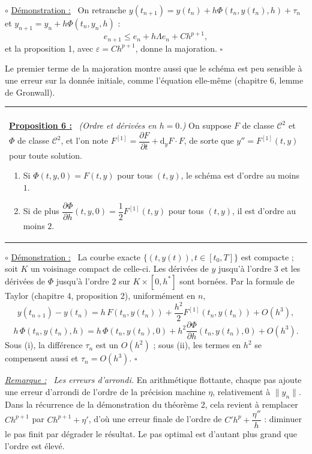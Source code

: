 \documentclass[a4paper,twoside]{report}
\makeatletter
\newenvironment{cadre}%
 {\par\vspace{2mm}\noindent\begin{tabular}{|@{\hspace{4mm}}p{0.93\textwidth}@{\hspace{4mm}}|}
  \hline \\[-2mm]}%
 {\\[2mm] \hline \end{tabular}\par\vspace{3mm}}
\newcommand{\propo}[1]{\textbf{\underline{Proposition #1 :}}~}
\newenvironment{demo}%
 {\par\needspace{4\baselineskip}\vspace{1mm}\noindent$\circ$ \underline{Démonstration :}~\setlength{\parskip}{3pt plus 1pt}}%
 {\hfill$\square$\par\vspace{2mm}}
\newenvironment{remarque}%
 {\par\needspace{6\baselineskip}\vspace{1mm}\begin{list}{}{\leftmargin=1cm \rightmargin=0.5cm}\item[]%
  \textit{\underline{Remarque :}}~}%
 {\end{list}\vspace{1mm}}
\newcommand{\dd}{\mathrm{d}}                      %
\newcommand{\norme}[1]{\lVert #1 \rVert}         %
\newcommand{\Cc}{\mathcal{C}}                     %
\newcommand{\dpd}[2]{\dfrac{\partial #1}{\partial #2}}  %
\makeatother
\begin{document}
\begin{demo}
On retranche $y(t_{n + 1}) = y(t_{n}) + h\Phi(t_{n}, y(t_{n}), h) + \tau_{n}$ et $y_{n + 1} = y_{n} + h\Phi(t_{n}, y_{n}, h)$ :
\[ e_{n + 1} \leqslant e_{n} + h\Lambda e_{n} + C h^{p + 1}, \]
et la proposition 1, avec $\varepsilon = C h^{p + 1}$, donne la majoration.
\end{demo}

\noindent Le premier terme de la majoration montre aussi que le schéma est peu sensible à une erreur sur la donnée initiale, comme l'équation elle-même (chapitre 6, lemme de Gronwall).

\begin{cadre}
\propo{6} \emph{(Ordre et dérivées en $h = 0$.)} On suppose $F$ de classe $\Cc^{2}$ et $\Phi$ de classe $\Cc^{2}$, et l'on note $F^{[1]} = \dpd{F}{t} + \dd_{y}F \cdot F$, de sorte que $y'' = F^{[1]}(t, y)$ pour toute solution.
\begin{enumerate}[label=(\roman*),topsep=3pt,itemsep=3pt]
  \item Si $\Phi(t, y, 0) = F(t, y)$ pour tous $(t, y)$, le schéma est d'ordre au moins $1$.
  \item Si de plus $\dpd{\Phi}{h}(t, y, 0) = \dfrac{1}{2}F^{[1]}(t, y)$ pour tous $(t, y)$, il est d'ordre au moins $2$.
\end{enumerate}
\end{cadre}

\begin{demo}
La courbe exacte $\{(t, y(t)), t \in [t_{0}, T]\}$ est compacte ; soit $K$ un voisinage compact de celle-ci. Les dérivées de $y$ jusqu'à l'ordre $3$ et les dérivées de $\Phi$ jusqu'à l'ordre $2$ sur $K \times [0, h^{*}]$ sont bornées. Par la formule de Taylor (chapitre 4, proposition 2), uniformément en $n$,
\[ y(t_{n + 1}) - y(t_{n}) = h\,F(t_{n}, y(t_{n})) + \frac{h^{2}}{2}F^{[1]}(t_{n}, y(t_{n})) + O(h^{3}), \]
\[ h\,\Phi(t_{n}, y(t_{n}), h) = h\,\Phi(t_{n}, y(t_{n}), 0) + h^{2}\dpd{\Phi}{h}(t_{n}, y(t_{n}), 0) + O(h^{3}). \]
Sous (i), la différence $\tau_{n}$ est un $O(h^{2})$ ; sous (ii), les termes en $h^{2}$ se compensent aussi et $\tau_{n} = O(h^{3})$.
\end{demo}

\begin{remarque}
\emph{Les erreurs d'arrondi.} En arithmétique flottante, chaque pas ajoute une erreur d'arrondi de l'ordre de la précision machine $\eta$, relativement à $\norme{y_{n}}$. Dans la récurrence de la démonstration du théorème 2, cela revient à remplacer $C h^{p + 1}$ par $C h^{p + 1} + \eta'$, d'où une erreur finale de l'ordre de $C' h^{p} + \dfrac{\eta''}{h}$ : diminuer le pas finit par dégrader le résultat. Le pas optimal est d'autant plus grand que l'ordre est élevé.
\end{remarque}
\end{document}
